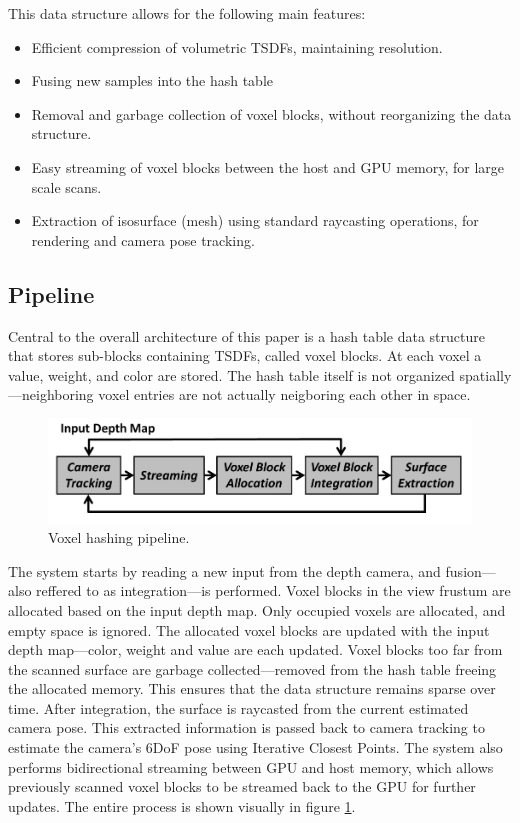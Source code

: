 \documentclass[10pt, twocolumn]{article}
\begin{document}
This data structure allows for the following main features: 

\begin{itemize}
    \item Efficient compression of volumetric TSDFs, maintaining resolution.
    \item Fusing new samples into the hash table
    \item Removal and garbage collection of voxel blocks, without reorganizing
        the data structure.
    \item Easy streaming of voxel blocks between the host and GPU memory, for
      large scale scans.
    \item Extraction of isosurface (mesh) using standard raycasting
        operations, for rendering and camera pose tracking.
\end{itemize}


\subsection{Pipeline}

Central to the overall architecture of this paper is a hash table data structure
that stores sub-blocks containing TSDFs, called voxel blocks. At each voxel a
value, weight, and color are stored. The hash table itself is not organized
spatially---neighboring voxel entries are not actually neigboring each other in space.

\begin{figure}
  \centering
  \includegraphics[width=1.0\linewidth]{voxelhashingpipeline}
  \caption{Voxel hashing pipeline.}
  \label{fig:vhpipeline}
\end{figure}


The system starts by reading a new input from the depth camera, and fusion---also
reffered to as integration---is performed. Voxel blocks in the view frustum are
allocated based on the input depth map. Only occupied voxels are allocated, and
empty space is ignored. The allocated voxel blocks are updated with the input
depth map---color, weight and value are each updated. Voxel blocks too far from
the scanned surface are garbage collected---removed from the hash table freeing
the allocated memory. This ensures that the data structure remains sparse over
time. After integration, the surface is raycasted from the current estimated
camera pose. This extracted information is passed back to camera tracking to
estimate the camera's 6DoF pose using Iterative Closest Points. The system also
performs bidirectional streaming between GPU and host memory, which allows
previously scanned voxel blocks to be streamed back to the GPU for further
updates. The entire process is shown visually in figure \ref{fig:vhpipeline}.
\end{document}

